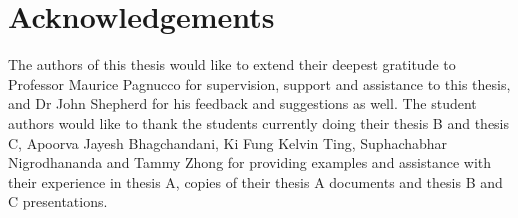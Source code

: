 \chapter*{Acknowledgements}\label{ack}

The authors of this thesis would like to extend their deepest gratitude to Professor Maurice Pagnucco for supervision, support and assistance to this thesis, and Dr John Shepherd for his feedback and suggestions as well.
The student authors would like to thank the students currently doing their thesis B and thesis C, Apoorva Jayesh Bhagchandani, Ki Fung Kelvin Ting, Suphachabhar Nigrodhananda and Tammy Zhong for providing examples and assistance with their experience in thesis A, copies of their thesis A documents and thesis B and C presentations.
